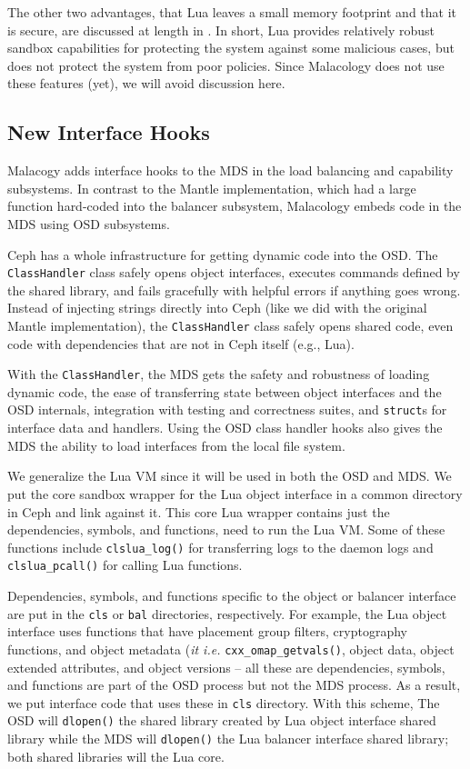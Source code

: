 \documentclass[10pt,twocolumn]{article}
\begin{document}
The other two advantages, that Lua leaves a small memory footprint and
that it is secure, are discussed at length in 
\cite{ierusalimschy_programming_2006,neto:dls14-luaos}. In short, Lua
provides relatively robust sandbox capabilities for protecting the
system against some malicious cases, but does not protect the system
from poor policies. Since Malacology does not use these features (yet),
we will avoid discussion here.

\subsection{New Interface Hooks}\label{new-interface-hooks}

Malacogy adds interface hooks to the MDS in the load balancing and
capability subsystems. In contrast to the Mantle implementation, which
had a large function hard-coded into the balancer subsystem, Malacology
embeds code in the MDS using OSD subsystems.

Ceph has a whole
infrastructure for getting dynamic code into the OSD. The
\texttt{ClassHandler} class safely opens object interfaces, executes
commands defined by the shared library, and fails gracefully with
helpful errors if anything goes wrong. Instead of injecting strings
directly into Ceph (like we did with the original Mantle
implementation), the \texttt{ClassHandler} class safely opens shared
code, even code with dependencies that are not in Ceph itself (e.g.,
Lua).

With the \texttt{ClassHandler}, the MDS gets the safety and robustness
of loading dynamic code, the ease of transferring state between object
interfaces and the OSD internals, integration with testing and
correctness suites, and \texttt{struct}s for interface data and
handlers. Using the OSD class handler hooks also gives the MDS the
ability to load interfaces from the local file system.

We generalize the Lua VM since it will be used in both the OSD and MDS.
We put the core sandbox wrapper for the Lua object interface in a common
directory in Ceph and link against it. This core Lua wrapper contains
just the dependencies, symbols, and functions, need to run the Lua VM.
Some of these functions include \texttt{clslua\_log()} for transferring
logs to the daemon logs and \texttt{clslua\_pcall()} for calling Lua
functions.

Dependencies, symbols, and functions specific to the object or balancer
interface are put in the \texttt{cls} or \texttt{bal} directories,
respectively. For example, the Lua object interface uses functions that
have placement group filters, cryptography functions, and object
metadata (\emph{it i.e.} \texttt{cxx\_omap\_getvals()}, object data,
object extended attributes, and object versions -- all these are
dependencies, symbols, and functions are part of the OSD process but not
the MDS process. As a result, we put interface code that uses these in
\texttt{cls} directory. With this scheme, The OSD will \texttt{dlopen()}
the shared library created by Lua object interface shared library while
the MDS will \texttt{dlopen()} the Lua balancer interface shared
library; both shared libraries will the Lua core.
\fi
\end{document}

